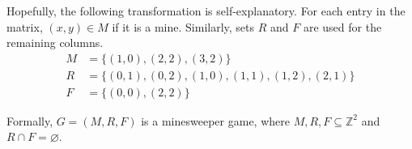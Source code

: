 \documentclass[12pt]{article}
\begin{document}
Hopefully, the following transformation is self-explanatory.
For each entry in the matrix, \((x, y) \in M\) if it is a mine.
Similarly, sets \(R\) and \(F\) are used for the remaining columns.
\[
    \begin{aligned}
        M & = \{(1, 0), (2, 2), (3, 2)\}                         \\
        R & = \{(0, 1), (0, 2), (1, 0), (1, 1), (1, 2), (2, 1)\} \\
        F & = \{(0, 0), (2, 2)\}
    \end{aligned}
\]

Formally, \(G = (M, R, F)\) is a minesweeper game, where \(M, R, F \subseteq \mathbb{Z}^2\) and \(R \cap F = \varnothing \).
\end{document}
